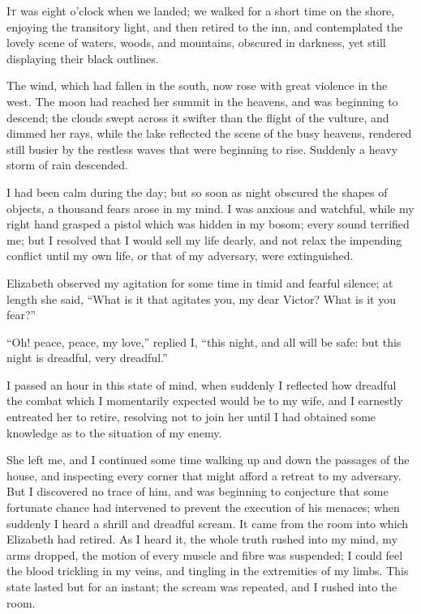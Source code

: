 
\textsc{It} was eight o'clock when we landed;
we walked for a short time on the shore,
enjoying the transitory light, and then
retired to the inn, and contemplated
the lovely scene of waters, woods, and
mountains, obscured in darkness, yet
still displaying their black outlines.

The wind, which had fallen in the
south, now rose with great violence in
the west. The moon had reached her
summit in the heavens, and was beginning
to descend; the clouds swept
across it swifter than the flight of the
vulture, and dimmed her rays, while
the lake reflected the scene of the busy
heavens, rendered still busier by the
restless waves that were beginning to
rise. Suddenly a heavy storm of rain
descended.

I had been calm during the day; but
so soon as night obscured the shapes
of objects, a thousand fears arose in my
mind. I was anxious and watchful,
while my right hand grasped a pistol
which was hidden in my bosom; every
sound terrified me; but I resolved that
I would sell my life dearly, and not relax
the impending conflict until my
own life, or that of my adversary, were
extinguished.

Elizabeth observed my agitation for
some time in timid and fearful silence;
at length she said, ``What is it that
agitates you, my dear Victor? What is
it you fear?''

``Oh! peace, peace, my love,'' replied
I, ``this night, and all will be
safe: but this night is dreadful, very
dreadful.''

I passed an hour in this state of
mind, when suddenly I reflected how
dreadful the combat which I momentarily
expected would be to my wife,
and I earnestly entreated her to retire,
resolving not to join her until I had
obtained some knowledge as to the
situation of my enemy.

She left me, and I continued some
time walking up and down the passages
of the house, and inspecting every corner
that might afford a retreat to my
adversary. But I discovered no trace
of him, and was beginning to conjecture
that some fortunate chance had
intervened to prevent the execution of
his menaces; when suddenly I heard
a shrill and dreadful scream. It came
from the room into which Elizabeth
had retired. As I heard it, the whole
truth rushed into my mind, my arms
dropped, the motion of every muscle
and fibre was suspended; I could feel
the blood trickling in my veins, and
tingling in the extremities of my limbs.
This state lasted but for an instant; the
scream was repeated, and I rushed into
the room.

